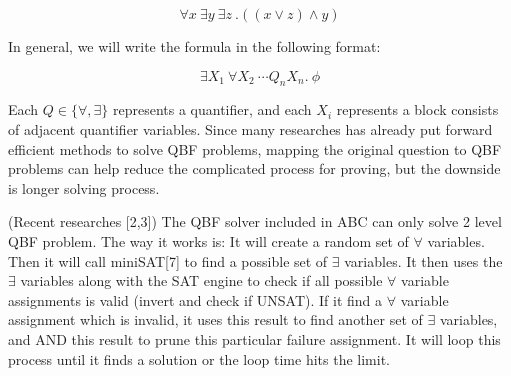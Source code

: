 \[ \forall x\ \exists y\ \exists z\ .((x\lor z)\land y) \]

In general, we will write the formula in the following format:

\[ \exists X_1\ \forall X_2\ \cdots Q_nX_n .~\phi \]

Each $Q \in \{\forall, \exists\}$ represents a quantifier, and each $X_i$ represents a block consists of adjacent quantifier variables. Since many researches has already put forward efficient methods to solve QBF problems, mapping the original question to QBF problems can help reduce the complicated process for proving, but the downside is longer solving process.

(Recent researches [2,3]) The QBF solver included in ABC can only solve 2 level QBF problem.
The way it works is: It will create a random set of $\forall$ variables. Then it will call miniSAT[7] to find a possible set of $\exists$ variables. It then uses the $\exists$ variables along with the SAT engine to check if all possible $\forall$ variable assignments is valid (invert and check if UNSAT). If it find a $\forall$ variable assignment which is invalid, it uses this result to find another set of $\exists$ variables, and AND this result to prune this particular failure assignment. It will loop this process until it finds a solution or the loop time hits the limit.

